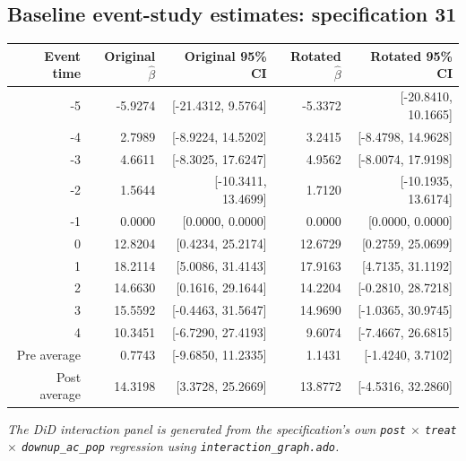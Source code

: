 \documentclass[10pt]{article}
\begin{document}
\subsection*{Baseline event-study estimates: specification 31}
\begin{center}
\scriptsize
\begin{tabular}{r rr rr}
\toprule
Event time & Original $\hat\beta$ & Original 95\% CI & Rotated $\hat\beta$ & Rotated 95\% CI \\
\midrule
-5 & -5.9274 & [-21.4312, 9.5764] & -5.3372 & [-20.8410, 10.1665] \\
-4 & 2.7989 & [-8.9224, 14.5202] & 3.2415 & [-8.4798, 14.9628] \\
-3 & 4.6611 & [-8.3025, 17.6247] & 4.9562 & [-8.0074, 17.9198] \\
-2 & 1.5644 & [-10.3411, 13.4699] & 1.7120 & [-10.1935, 13.6174] \\
-1 & 0.0000 & [0.0000, 0.0000] & 0.0000 & [0.0000, 0.0000] \\
0 & 12.8204 & [0.4234, 25.2174] & 12.6729 & [0.2759, 25.0699] \\
1 & 18.2114 & [5.0086, 31.4143] & 17.9163 & [4.7135, 31.1192] \\
2 & 14.6630 & [0.1616, 29.1644] & 14.2204 & [-0.2810, 28.7218] \\
3 & 15.5592 & [-0.4463, 31.5647] & 14.9690 & [-1.0365, 30.9745] \\
4 & 10.3451 & [-6.7290, 27.4193] & 9.6074 & [-7.4667, 26.6815] \\
\midrule
Pre average & 0.7743 & [-9.6850, 11.2335] & 1.1431 & [-1.4240, 3.7102] \\
Post average & 14.3198 & [3.3728, 25.2669] & 13.8772 & [-4.5316, 32.2860] \\
\bottomrule
\end{tabular}
\end{center}
\medskip
\textit{The DiD interaction panel is generated from the specification's own \texttt{post} $\times$ \texttt{treat} $\times$ \texttt{downup\_ac\_pop} regression using \texttt{interaction\_graph.ado}.}
\clearpage
\end{document}
